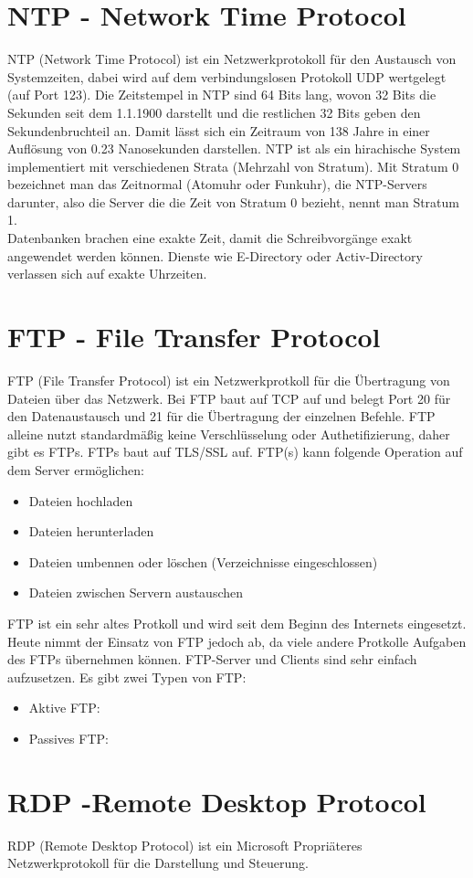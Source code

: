 \documentclass[a4paper]{article}
\begin{document}
\section{NTP - Network Time Protocol}

NTP (Network Time Protocol) ist ein Netzwerkprotokoll für den Austausch von Systemzeiten, dabei wird auf dem verbindungslosen Protokoll UDP wertgelegt (auf Port 123). Die Zeitstempel in NTP sind 64 Bits lang, wovon 32 Bits die Sekunden seit dem 1.1.1900 darstellt und die restlichen 32 Bits geben den Sekundenbruchteil an. Damit lässt sich ein Zeitraum von 138 Jahre in einer Auflösung von 0.23 Nanosekunden darstellen. NTP ist als ein hirachische System implementiert mit verschiedenen Strata (Mehrzahl von Stratum). Mit Stratum 0 bezeichnet man das Zeitnormal (Atomuhr oder Funkuhr), die NTP-Servers darunter, also die Server die die Zeit von Stratum 0 bezieht, nennt man Stratum 1.\\
Datenbanken brachen eine exakte Zeit, damit die Schreibvorgänge exakt angewendet werden können. Dienste wie E-Directory oder Activ-Directory verlassen sich auf exakte Uhrzeiten.

\newpage
\section{FTP - File Transfer Protocol}

FTP (File Transfer Protocol) ist ein Netzwerkprotkoll für die Übertragung von Dateien über das Netzwerk. Bei FTP baut auf TCP auf und belegt Port 20 für den Datenaustausch und 21 für die Übertragung der einzelnen Befehle. FTP alleine nutzt standardmäßig keine Verschlüsselung oder Authetifizierung, daher gibt es FTPs. FTPs baut auf TLS/SSL auf. FTP(s) kann folgende Operation auf dem Server ermöglichen:

\begin{itemize}
\item Dateien hochladen
\item Dateien herunterladen
\item Dateien umbennen oder löschen (Verzeichnisse eingeschlossen)
\item Dateien zwischen Servern austauschen
\end{itemize}

FTP ist ein sehr altes Protkoll und wird seit dem Beginn des Internets eingesetzt. Heute nimmt der Einsatz von FTP jedoch ab, da viele andere Protkolle Aufgaben des FTPs übernehmen können. FTP-Server und Clients sind sehr einfach aufzusetzen.
Es gibt zwei Typen von FTP:

\begin{itemize}
\item Aktive FTP: 
\item Passives FTP:
\end{itemize}

\newpage
\section{RDP -Remote Desktop Protocol}

RDP (Remote Desktop Protocol) ist ein Microsoft Propriäteres Netzwerkprotokoll für die Darstellung und Steuerung.
\end{document}
